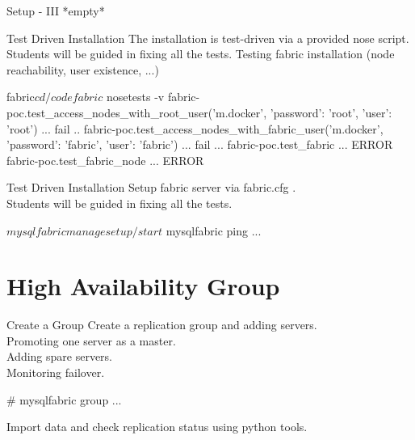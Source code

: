 \documentclass{beamer}[10]
\begin{document}
\begin{pyframe}{Setup - III}
*empty*
\end{pyframe}


\begin{pyframe}{Test Driven Installation}
The installation is test-driven via a provided nose script.
Students will be guided in fixing all the tests.
Testing fabric installation (node reachability, user existence, ...)

\begin{bashcode}
fabric$ cd /code
fabric$ nosetests -v
fabric-poc.test_access_nodes_with_root_user('m.docker', {'password': 'root', 'user': 'root'}) ... fail
..
fabric-poc.test_access_nodes_with_fabric_user('m.docker', {'password': 'fabric', 'user': 'fabric'}) ... fail
...
fabric-poc.test_fabric ... ERROR
fabric-poc.test_fabric_node ... ERROR
\end{bashcode}
\end{pyframe}



\begin{pyframe}{Test Driven Installation}
Setup fabric server via fabric.cfg . \\
Students will be guided in fixing all the tests.

\begin{bashcode}
$ mysqlfabric manage setup / start
$ mysqlfabric ping ...
\end{bashcode}
\end{pyframe}


\section{High Availability Group}
\begin{pyframe}{Create a Group}
Create a replication group and adding
servers. \\

Promoting one server as a master. \\

Adding spare servers. \\

Monitoring failover. \\
\begin{bashcode}
# mysqlfabric group ...
\end{bashcode}
\end{pyframe}


\begin{pyframe}{}
Import data and check replication status using python tools.

\end{pyframe}
\end{document}
